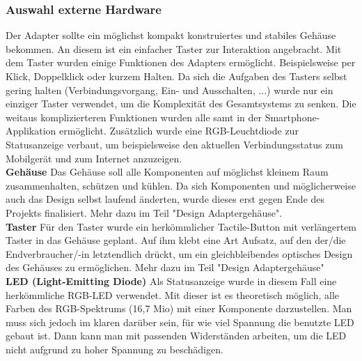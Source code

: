 \documentclass[11pt, twoside]{article}
\begin{document}
\subsubsection{Auswahl externe Hardware}
Der Adapter sollte ein möglichst kompakt konstruiertes und stabiles Gehäuse bekommen. An diesem ist ein einfacher Taster zur Interaktion angebracht. Mit dem Taster wurden einige Funktionen des Adapters ermöglicht. Beispielsweise per Klick, Doppelklick oder kurzem Halten. Da sich die Aufgaben des Tasters selbst gering halten (Verbindungsvorgang, Ein- und Ausschalten, ...) wurde nur ein einziger Taster verwendet, um die Komplexität des Gesamtsystems zu senken. Die weitaus komplizierteren Funktionen wurden alle samt in der Smartphone-Applikation ermöglicht. Zusätzlich wurde eine RGB-Leuchtdiode zur Statusanzeige verbaut, um beispielsweise den aktuellen Verbindungsstatus zum Mobilgerät und zum Internet anzuzeigen. \newline \\
\textbf{Gehäuse} \newline
Das Gehäuse soll alle Komponenten auf möglichst kleinem Raum zusammenhalten, schützen und kühlen. Da sich Komponenten und möglicherweise auch das Design selbst laufend änderten, wurde dieses erst gegen Ende des Projekts finalisiert. Mehr dazu im Teil "Design Adaptergehäuse". \newline \\
\textbf{Taster} \newline
Für den Taster wurde ein herkömmlicher Tactile-Button mit verlängertem Taster in das Gehäuse geplant. Auf ihm klebt eine Art Aufsatz, auf den der/die Endverbraucher/-in letztendlich drückt, um ein gleichbleibendes optisches Design des Gehäuses zu ermöglichen. Mehr dazu im Teil "Design Adaptergehäuse"\newline \\
\textbf{LED (Light-Emitting Diode)} \newline
Als Statusanzeige wurde in diesem Fall eine herkömmliche RGB-LED verwendet. Mit dieser ist es theoretisch möglich, alle Farben des RGB-Spektrums (16,7 Mio) mit einer Komponente darzustellen.\newline
Man muss sich jedoch im klaren darüber sein, für wie viel Spannung die benutzte LED gebaut ist. Dann kann man mit passenden Widerständen arbeiten, um die LED nicht aufgrund zu hoher Spannung zu beschädigen.
\vspace{4mm} \newline
\parencite[vgl.][]{noauthor_urlnl05_nodate}
\end{document}
